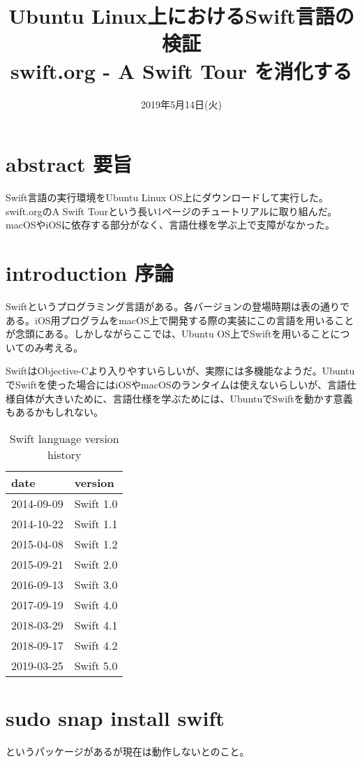\documentclass[uplatex,dvipdfmx]{jsarticle} \usepackage{amsmath,amssymb,bm}
\title{Ubuntu Linux上におけるSwift言語の検証\\swift.org - A Swift Tour を消化する} \author{} \date{2019年5月14日(火)}
\begin{document}
\maketitle

\section*{abstract 要旨}
Swift言語の実行環境をUbuntu Linux OS上にダウンロードして実行した。swift.orgのA Swift Tourという長い1ページのチュートリアルに取り組んだ。macOSやiOSに依存する部分がなく、言語仕様を学ぶ上で支障がなかった。



\section*{introduction 序論}
Swiftというプログラミング言語がある。各バージョンの登場時期は表の通りである。iOS用プログラムをmacOS上で開発する際の実装にこの言語を用いることが念頭にある。しかしながらここでは、Ubuntu OS上でSwiftを用いることについてのみ考える。

SwiftはObjective-Cより入りやすいらしいが、実際には多機能なようだ。UbuntuでSwiftを使った場合にはiOSやmacOSのランタイムは使えないらしいが、言語仕様自体が大きいために、言語仕様を学ぶためには、UbuntuでSwiftを動かす意義もあるかもしれない。

\begin{table} \centering
\begin{tabular}{ll}
date & version \\\hline
2014-09-09&Swift 1.0 \\
2014-10-22&Swift 1.1 \\
2015-04-08&Swift 1.2 \\
2015-09-21&Swift 2.0 \\
2016-09-13&Swift 3.0 \\
2017-09-19&Swift 4.0 \\
2018-03-29&Swift 4.1 \\
2018-09-17&Swift 4.2 \\
2019-03-25&Swift 5.0 \\\hline
\end{tabular}
\caption{Swift language version history}
\end{table}

\section*{sudo snap install swift}
というパッケージがあるが現在は動作しないとのこと。
\end{document}

